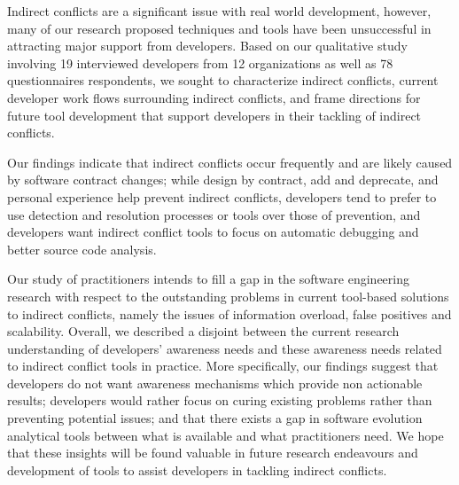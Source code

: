 \documentclass[conference]{IEEEtran}
\begin{document}
Indirect conflicts are a significant issue with real world development, however, many of our research proposed techniques and tools have been unsuccessful in attracting major support from developers. Based on our qualitative study involving
19 interviewed developers from 12 organizations as well as 78 questionnaires respondents, we sought to characterize indirect conflicts,
current developer work flows surrounding indirect conflicts, and frame directions for future tool development that support developers
in their tackling of indirect conflicts.

Our findings  indicate that indirect conflicts occur frequently and are likely caused by software contract changes;
while design by contract, add and deprecate, and personal experience help prevent indirect conflicts,
developers tend to prefer to use detection and resolution processes or tools
over those of prevention, and developers want indirect conflict tools to focus on automatic debugging and better source code analysis.

Our study of practitioners intends to fill a gap in the software engineering research with respect to the outstanding problems in current tool-based solutions to indirect conflicts, namely the issues of information overload, false positives and scalability. Overall, we described a disjoint between the current research understanding of developers' awareness needs and these awareness needs related to indirect conflict tools in practice. More specifically, our findings suggest that developers do not want awareness mechanisms which provide non actionable results; developers
would rather focus on curing existing problems rather than preventing potential issues;
and that there exists a gap in software evolution analytical tools between what is available and what practitioners need. We hope that these insights will be found valuable in future research endeavours and development of tools to assist developers in tackling indirect conflicts.




\end{document}
